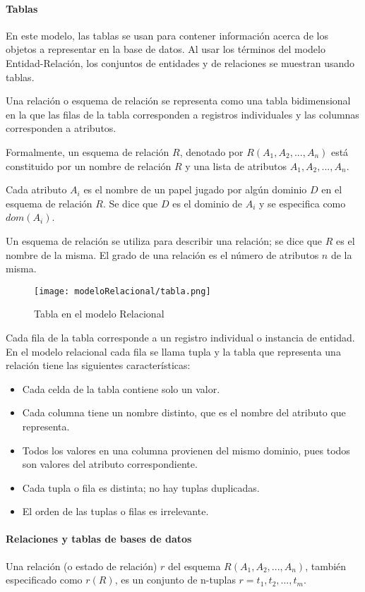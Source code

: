 \paragraph*{Tablas}
En este modelo, las tablas se usan para contener información acerca de los objetos a representar en la base de datos. Al usar los términos del modelo Entidad-Relación, los conjuntos de entidades y de relaciones se muestran usando tablas.


Una relación o esquema de relación se representa como una tabla bidimensional en la que las filas de la tabla corresponden a registros individuales y las columnas corresponden a atributos.

Formalmente, un esquema de relación $R$, denotado por $R(A_1, A_2,..., A_n)$ está constituido por un nombre de relación $R$ y una lista de atributos $A_1, A_2,..., A_n$. 


Cada atributo $A_i$ es el nombre de un papel jugado por algún dominio $D$ en el esquema de relación $R$. Se dice que $D$ es el dominio de $A_i$ y se especifica como $dom(A_i)$. 


Un esquema de relación se utiliza para describir una relación; se dice que $R$ es el nombre de la misma. El grado de una relación es el número de atributos $n$ de la misma.


\begin{figure}[ht]
    \centering
    \texttt{[image: modeloRelacional/tabla.png]}
    \caption{Tabla en el modelo Relacional}
    \label{img:modeloRelacional-Tabla}
\end{figure} 
Cada fila de la tabla corresponde a un registro individual o instancia de entidad. En el modelo relacional cada fila se llama tupla y la tabla que representa una relación tiene las siguientes características:
\begin{itemize}
    \item Cada celda de la tabla contiene solo un valor.
    \item Cada columna tiene un nombre distinto, que es el nombre del atributo que representa.
    \item Todos los valores en una columna provienen del mismo dominio, pues todos son valores del atributo correspondiente.
    \item Cada tupla o fila es distinta; no hay tuplas duplicadas.
    \item El orden de las tuplas o filas es irrelevante.
\end{itemize}
\paragraph*{Relaciones y tablas de bases de datos}   
Una relación (o estado de relación) $r$ del esquema $R(A_1, A_2,..., A_n)$, también especificado como $r(R)$, es un conjunto de n-tuplas $r={t_1, t_2,..., t_m}$.



